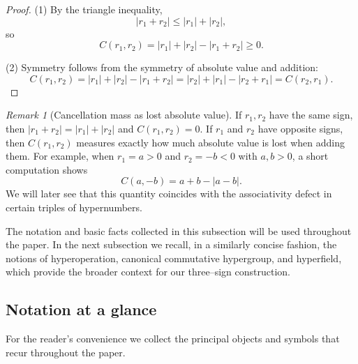 \documentclass[11pt]{amsart}
\numberwithin{equation}{section}
\theoremstyle{definition}
\theoremstyle{remark}
\newtheorem{remark}[theorem]{Remark}
\newcommand{\Cfun}{C}                      %
\begin{document}
\begin{proof}
(1) By the triangle inequality,
\[
  |r_1+r_2|\le|r_1|+|r_2|,
\]
so
\[
  \Cfun(r_1,r_2)=|r_1|+|r_2|-|r_1+r_2|\ge0.
\]

(2) Symmetry follows from the symmetry of absolute value and addition:
\[
  \Cfun(r_1,r_2)
  = |r_1|+|r_2|-|r_1+r_2|
  = |r_2|+|r_1|-|r_2+r_1|
  = \Cfun(r_2,r_1).
\]
\end{proof}

\begin{remark}[Cancellation mass as lost absolute value]\label{rem:basic-C}
If $r_1,r_2$ have the same sign, then $|r_1+r_2|=|r_1|+|r_2|$ and
$\Cfun(r_1,r_2)=0$.  If $r_1$ and $r_2$ have opposite signs, then
$\Cfun(r_1,r_2)$ measures exactly how much absolute value is lost when
adding them.  For example, when $r_1=a>0$ and $r_2=-b<0$ with $a,b>0$,
a short computation shows
\[
  \Cfun(a,-b) = a+b - |a-b|.
\]
We will later see that this quantity coincides with the associativity
defect in certain triples of hypernumbers.
\end{remark}

The notation and basic facts collected in this subsection will be used
throughout the paper.  In the next subsection we recall, in a similarly
concise fashion, the notions of hyperoperation, canonical commutative
hypergroup, and hyperfield, which provide the broader context for our
three--sign construction.


\subsection{Notation at a glance}\label{subsec:notation}

For the reader's convenience we collect the principal objects and symbols that
recur throughout the paper.
\end{document}
